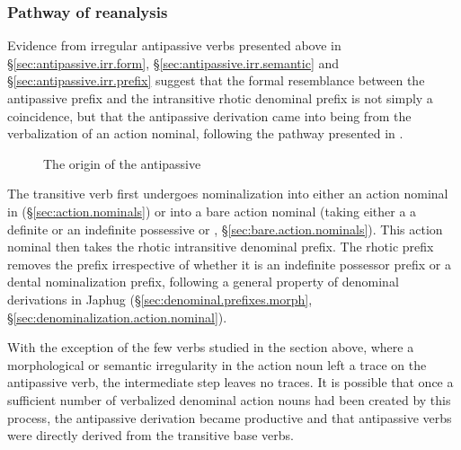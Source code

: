 \subsubsection{Pathway of reanalysis} \label{sec:antipassive.pathway} 
Evidence from irregular antipassive verbs presented above in §\ref{sec:antipassive.irr.form}, §\ref{sec:antipassive.irr.semantic} and §\ref{sec:antipassive.irr.prefix} suggest that the formal resemblance between the  antipassive prefix and the intransitive rhotic denominal  prefix is not simply a coincidence, but that the antipassive derivation came into being from the verbalization of an action nominal, following the pathway presented in .

   \begin{figure}
   \caption{The origin of the antipassive    } \label{fig:apass}  
\end{figure}

The transitive verb first undergoes nominalization into either an action nominal in  (§\ref{sec:action.nominals}) or into a bare action nominal (taking either a a definite or an indefinite possessive  or , §\ref{sec:bare.action.nominals}). This action nominal then takes the rhotic intransitive denominal prefix. The rhotic prefix removes the  prefix irrespective of whether it is an indefinite possessor prefix or a dental nominalization prefix, following a general property of denominal derivations in Japhug (§\ref{sec:denominal.prefixes.morph}, §\ref{sec:denominalization.action.nominal}). 

With the exception of the few verbs studied in the section above, where a morphological or semantic irregularity in the action noun left a trace on the antipassive verb, the intermediate step leaves no traces. It is possible that once a sufficient number of verbalized denominal action nouns had been created by this process, the antipassive derivation became productive and  that antipassive verbs were directly derived from the transitive base verbs.
 
